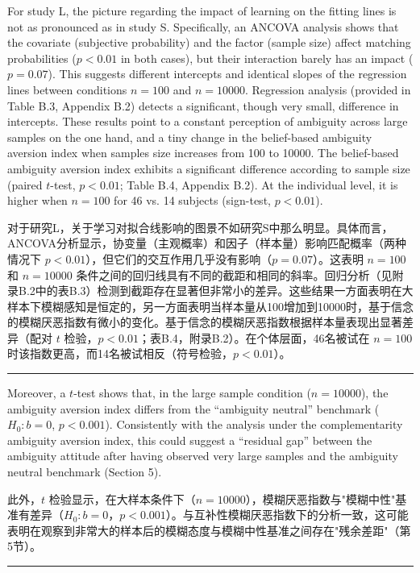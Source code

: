 \documentclass[12pt,a4paper]{article}
\newenvironment{original}
  {\par\vspace{0.5em}\noindent\color{black}\ignorespaces}
  {\par\vspace{0.3em}}
\newenvironment{translation}
  {\par\noindent\color{transblue}\ignorespaces}
  {\par\vspace{0.8em}\hrule\vspace{0.5em}}
\begin{document}
\begin{original}
For study L, the picture regarding the impact of learning on the fitting lines is not as pronounced as in study S. Specifically, an ANCOVA analysis shows that the covariate (subjective probability) and the factor (sample size) affect matching probabilities ($p < 0.01$ in both cases), but their interaction barely has an impact ($p = 0.07$). This suggests different intercepts and identical slopes of the regression lines between conditions $n = 100$ and $n = 10000$. Regression analysis (provided in Table B.3, Appendix B.2) detects a significant, though very small, difference in intercepts. These results point to a constant perception of ambiguity across large samples on the one hand, and a tiny change in the belief-based ambiguity aversion index when samples size increases from 100 to 10000. The belief-based ambiguity aversion index exhibits a significant difference according to sample size (paired $t$-test, $p < 0.01$; Table B.4, Appendix B.2). At the individual level, it is higher when $n = 100$ for 46 vs. 14 subjects (sign-test, $p < 0.01$).
\end{original}

\begin{translation}
对于研究L，关于学习对拟合线影响的图景不如研究S中那么明显。具体而言，ANCOVA分析显示，协变量（主观概率）和因子（样本量）影响匹配概率（两种情况下 $p < 0.01$），但它们的交互作用几乎没有影响（$p = 0.07$）。这表明 $n = 100$ 和 $n = 10000$ 条件之间的回归线具有不同的截距和相同的斜率。回归分析（见附录B.2中的表B.3）检测到截距存在显著但非常小的差异。这些结果一方面表明在大样本下模糊感知是恒定的，另一方面表明当样本量从100增加到10000时，基于信念的模糊厌恶指数有微小的变化。基于信念的模糊厌恶指数根据样本量表现出显著差异（配对 $t$ 检验，$p < 0.01$；表B.4，附录B.2）。在个体层面，46名被试在 $n = 100$ 时该指数更高，而14名被试相反（符号检验，$p < 0.01$）。
\end{translation}

\begin{original}
Moreover, a $t$-test shows that, in the large sample condition ($n = 10000$), the ambiguity aversion index differs from the ``ambiguity neutral'' benchmark ($H_0: b = 0$, $p < 0.001$). Consistently with the analysis under the complementarity ambiguity aversion index, this could suggest a ``residual gap'' between the ambiguity attitude after having observed very large samples and the ambiguity neutral benchmark (Section 5).
\end{original}

\begin{translation}
此外，$t$ 检验显示，在大样本条件下（$n = 10000$），模糊厌恶指数与"模糊中性"基准有差异（$H_0: b = 0$，$p < 0.001$）。与互补性模糊厌恶指数下的分析一致，这可能表明在观察到非常大的样本后的模糊态度与模糊中性基准之间存在"残余差距"（第5节）。
\end{translation}
\end{document}
